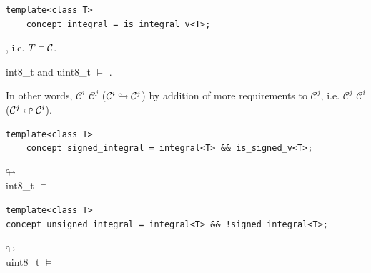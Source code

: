 \begin{lstlisting}
template<class T>
    concept integral = is_integral_v<T>;
\end{lstlisting}

, i.e. $T \vDash \mathcal{C}$.

\begin{nscenter}
int8\_t and uint8\_t $\models$ .
\end{nscenter}


In other words, $\mathcal{C}^i$  $\mathcal{C}^j$ ($\mathcal{C}^i \looparrowright \mathcal{C}^j$) by addition of more requirements to $\mathcal{C}^j$, i.e. $\mathcal{C}^j$  $\mathcal{C}^i$ ($\mathcal{C}^j \looparrowleft \mathcal{C}^i$). 

\begin{lstlisting}
template<class T>
    concept signed_integral = integral<T> && is_signed_v<T>;
\end{lstlisting}

\begin{nscenter}
 $\looparrowright$  \\
int8\_t $\models$   
\end{nscenter}

\begin{lstlisting}
template<class T>
concept unsigned_integral = integral<T> && !signed_integral<T>;
\end{lstlisting}

\begin{nscenter}
 $\looparrowright$  \\
uint8\_t $\models$   
\end{nscenter}

